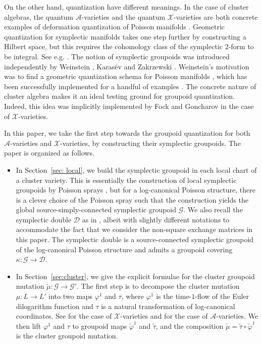 \documentclass{amsart}
\numberwithin{equation}{section}
\newcommand{\cA}{\mathcal{A}}
\newcommand{\cG}{\mathcal{G}}
\newcommand{\cD}{\mathcal{D}}
\newcommand{\cX}{\mathcal{X}}
\begin{document}
On the other hand, quantization have different meanings. In the case of cluster algebras, the quantum $\cA$-varieties \cite{berenstein-zelevinsky} and the quantum $\cX$-varieties \cite{MR2470108} are both concrete examples of deformation quantization of Poisson manifolds \cite{MR2062626}. Geometric quantization for symplectic manifolds takes one step further by constructing a Hilbert space, but this requires the cohomology class of the symplectic 2-form to be integral. See e.g. \cite{MR1806388}.
The notion of symplectic groupoids was introduced independently by Weinstein \cite{MR866024}, Karas\"{e}v \cite{MR1008479} and Zakrzewski \cite{MR1081010, MR1081011}. Weinstein's motivation was to find a geometric quantization schema for Poisson manifolds \cite{MR1104934}, which has been successfully implemented for a handful of examples \cite{MR2417440, MR2925830}. The concrete nature of cluster algebra makes it an ideal testing ground for groupoid quantization. Indeed, this idea was implicitly implemented by Fock and Goncharov \cite{MR2470108} in the case of $\cX$-varieties.

In this paper, we take the first step towards the groupoid quantization for both $\cA$-varieties and $\cX$-varieties, by constructing their symplectic groupoids. The paper is organized as follows.

\begin{itemize}
	\item In Section~\ref{sec: local}, we build the symplectic groupoid in each local chart of a cluster variety. This is essentially the construction of local symplectic groupoids by Poisson sprays \cite{MR2900786, CMS17}, but for a log-canonical Poisson structure, there is a clever choice of the Poisson spray such that the construction yields the global source-simply-connected symplectic groupoid $\cG$. We also recall the symplectic double $\cD$ as in \cite{MR2470108}, albeit with slightly different notations to accommodate the fact that we consider the non-square exchange matrices in this paper. The symplectic double is a source-connected symplectic groupoid of the log-canonical Poisson structure and admits a groupoid covering $\kappa: \cG \to \cD$.
	\item In Section~\ref{sec:cluster}, we give the explicit formulae for the cluster groupoid mutation $\tilde{\mu}: \cG \to \cG'$. The first step is to decompose the cluster mutation $\mu: L \to L'$ into two maps $\varphi^1$ and $\tau$, where $\varphi^1$ is the time-$1$-flow of the Euler dilogarithm function and $\tau$ is a natural transformation of log-canonical coordinates. See \cite{MR2567745} for the case of $\cX$-varieties and \cite{MR3691969} for the case of $\cA$-varieties. We then lift $\varphi^1$ and $\tau$ to groupoid maps $\tilde{\varphi}^1$ and $\tilde{\tau}$, and the composition $\tilde{\mu} = \tilde{\tau} \circ \tilde{\varphi}^1$ is the cluster groupoid mutation.
\end{itemize}
\end{document}
